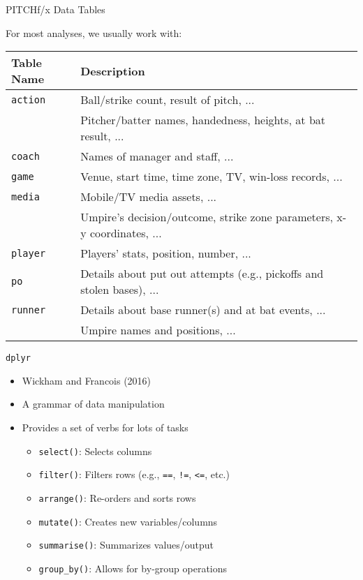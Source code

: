 \begin{frame}{PITCHf/x Data Tables}

For most analyses, we usually work with:

\small

\begin{table}[ht]
\centering
\begin{tabular}{ll}
\hline
Table Name & Description \\ 
\hline
{\texttt{action}} & Ball/strike count, result of pitch, ... \\ 
\rowcolor{SpringGreen}{\texttt{atbat}} & Pitcher/batter names, handedness, heights, at bat result, ... \\ 
{\texttt{coach}} & Names of manager and staff, ... \\ 
{\texttt{game}} & Venue, start time, time zone, TV, win-loss records, ... \\ 
{\texttt{media}} & Mobile/TV media assets, ... \\ 
\rowcolor{SpringGreen}{\texttt{pitch}} & Umpire's decision/outcome, strike zone parameters, x-y coordinates, ... \\ 
{\texttt{player}} & Players' stats, position, number, ... \\ 
{\texttt{po}} & Details about put out attempts (e.g., pickoffs and stolen bases), ... \\ 
{\texttt{runner}} & Details about base runner(s) and at bat events, ... \\ 
\rowcolor{SpringGreen}{\texttt{umpire}} & Umpire names and positions, ... \\ 
\hline
\end{tabular}
\end{table}

\end{frame}

\begin{frame}[fragile]{\texttt{dplyr}}

\begin{itemize}
\tightlist
\item
  Wickham and Francois (2016)
\item
  A grammar of data manipulation
\item
  Provides a set of verbs for lots of tasks

  \begin{itemize}
  \tightlist
  \item
    \texttt{select()}: Selects columns
  \item
    \texttt{filter()}: Filters rows (e.g., \texttt{==}, \texttt{!=},
    \texttt{\textless{}=}, etc.)
  \item
    \texttt{arrange()}: Re-orders and sorts rows
  \item
    \texttt{mutate()}: Creates new variables/columns
  \item
    \texttt{summarise()}: Summarizes values/output
  \item
    \texttt{group\_by()}: Allows for by-group operations
  \end{itemize}
\end{itemize}

\end{frame}

